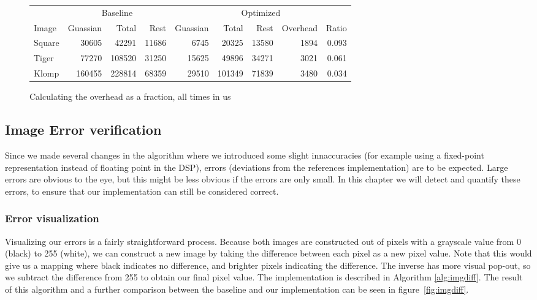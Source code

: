 \begin{figure}[h]
\centering
\begin{tabular}{l | r r r | r r r r r}
        & \multicolumn{3}{|c|}{Baseline}    & \multicolumn{5}{|c}{Optimized}                        \\
Image   & Guassian  & Total     & Rest      & Guassian  & Total     & Rest  & Overhead  & Ratio     \\
\hline
Square  & 30605     & 42291     & 11686     & 6745      & 20325     & 13580 & 1894      & 0.093     \\
Tiger   & 77270     & 108520    & 31250     & 15625     & 49896     & 34271 & 3021      & 0.061     \\
Klomp   & 160455    & 228814    & 68359     & 29510     & 101349    & 71839 & 3480      & 0.034     \\
\end{tabular}
\caption{Calculating the overhead as a fraction, all times in us}
\label{tab:overhead}
\end{figure}

\subsection{Image Error verification}
Since we made several changes in the algorithm where we introduced some slight innaccuracies (for example using a fixed-point representation instead of floating point in the DSP), errors (deviations from the references implementation) are to be expected. Large errors are obvious to the eye, but this might be less obvious if the errors are only small. In this chapter we will detect and quantify these errors, to ensure that our implementation can still be considered correct.

\subsubsection{Error visualization}
Visualizing our errors is a fairly straightforward process. Because both images are constructed out of pixels with a grayscale value from 0 (black) to 255 (white), we can construct a new image by taking the difference between each pixel as a new pixel value. Note that this would give us a mapping where black indicates no difference, and brighter pixels indicating the difference. The inverse has more visual pop-out, so we subtract the difference from 255 to obtain our final pixel value. The implementation is described in Algorithm \ref{alg:imgdiff}. The result of this algorithm and a further comparison between the baseline and our implementation can be seen in figure~\ref{fig:imgdiff}.

